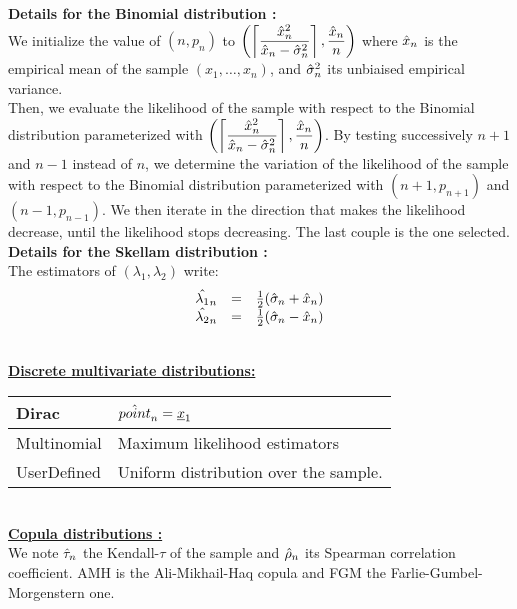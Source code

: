 {  {\bf Details for the Binomial distribution :} \\

  We initialize the value of $(n,p_n)$ to $\displaystyle\left(\left\lceil\frac{\Hat{x}_n^2}{\Hat{x}_n-\Hat{\sigma}_n^2}\right\rceil, \frac{\Hat{x}_n}{n}\right)$ where $\Hat{x}_n$ is the empirical mean of the sample $(x_1, \hdots, x_n)$, and $\Hat{\sigma}_n^2$ its unbiaised empirical variance.\\
  Then, we evaluate the likelihood of the sample with respect to the Binomial distribution parameterized with $\displaystyle\left(\left\lceil\frac{\Hat{x}_n^2}{\Hat{x}_n-\Hat{\sigma}_n^2}\right\rceil, \frac{\Hat{x}_n}{n}\right)$. By testing successively $n+1$ and $n-1$ instead of $n$, we determine the variation of the likelihood of the sample with respect to the Binomial distribution parameterized with $(n+1,p_{n+1})$ and $(n-1,p_{n-1})$. We then iterate in the direction that makes the likelihood decrease, until the likelihood stops decreasing. The last couple is the one selected.\\

  {\bf Details for the Skellam distribution :} \\

  The estimators of $(\lambda_1, \lambda_2)$ write:
  \begin{align*}
    \begin{array}{lcl}
      \Hat{\lambda_1}_n & = & \frac{1}{2}(\Hat{\sigma}_n + \Hat{x}_n) \\
      \Hat{\lambda_2}_n & = & \frac{1}{2}(\Hat{\sigma}_n - \Hat{x}_n)
    \end{array}
  \end{align*}
  \rule{0pt}{1em}\\

  \underline{\textbf{Discrete multivariate distributions:}}\\

  \begin{tabular}{|l|p{12cm}|}
    \hline
    Dirac & $\Hat{point}_n = {\underline{x}}_1$\\
    \hline
    Multinomial  &  Maximum likelihood estimators\\
    \hline
    UserDefined & Uniform distribution over the sample.\\
    \hline
  \end{tabular}\rule{0pt}{1em}\\

  \underline{\textbf{Copula distributions :}}\\
  We note $\Hat{\tau}_n$ the Kendall-$\tau$ of the sample and $\Hat{\rho}_n$ its Spearman correlation coefficient. AMH is the Ali-Mikhail-Haq copula and FGM the  Farlie-Gumbel-Morgenstern one.

}
